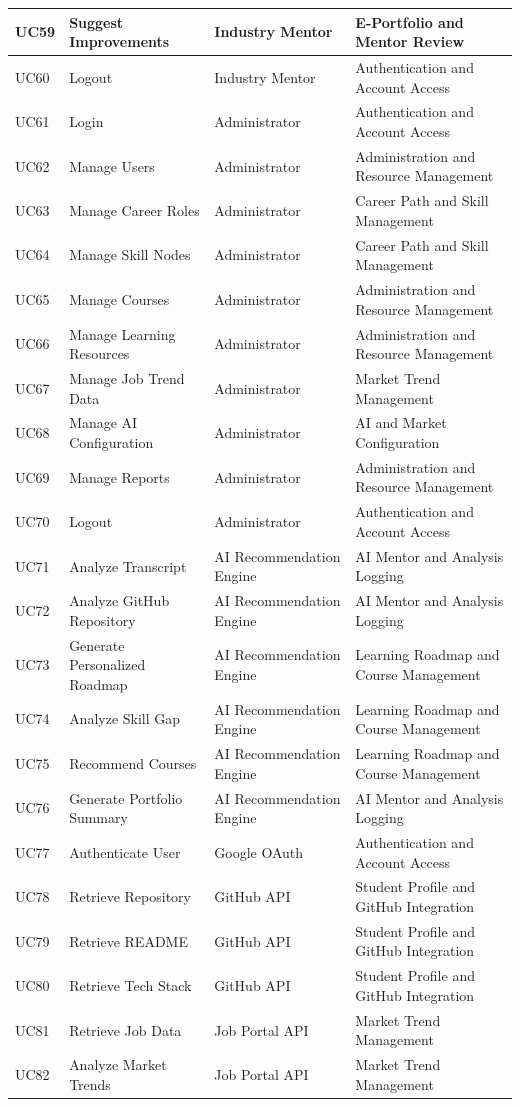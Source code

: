 \begin{longtable}{|>{\centering\arraybackslash}m{0.8cm}|>{\raggedright\arraybackslash}m{3.0cm}|>{\raggedright\arraybackslash}m{2.4cm}|>{\raggedright\arraybackslash}m{4.8cm}|}
\hline
UC59 & Suggest Improvements & Industry Mentor & E-Portfolio and Mentor Review \\
\hline
UC60 & Logout & Industry Mentor & Authentication and Account Access \\
\hline
UC61 & Login & Administrator & Authentication and Account Access \\
\hline
UC62 & Manage Users & Administrator & Administration and Resource Management \\
\hline
UC63 & Manage Career Roles & Administrator & Career Path and Skill Management \\
\hline
UC64 & Manage Skill Nodes & Administrator & Career Path and Skill Management \\
\hline
UC65 & Manage Courses & Administrator & Administration and Resource Management \\
\hline
UC66 & Manage Learning Resources & Administrator & Administration and Resource Management \\
\hline
UC67 & Manage Job Trend Data & Administrator & Market Trend Management \\
\hline
UC68 & Manage AI Configuration & Administrator & AI and Market Configuration \\
\hline
UC69 & Manage Reports & Administrator & Administration and Resource Management \\
\hline
UC70 & Logout & Administrator & Authentication and Account Access \\
\hline
UC71 & Analyze Transcript & AI Recommendation Engine & AI Mentor and Analysis Logging \\
\hline
UC72 & Analyze GitHub Repository & AI Recommendation Engine & AI Mentor and Analysis Logging \\
\hline
UC73 & Generate Personalized Roadmap & AI Recommendation Engine & Learning Roadmap and Course Management \\
\hline
UC74 & Analyze Skill Gap & AI Recommendation Engine & Learning Roadmap and Course Management \\
\hline
UC75 & Recommend Courses & AI Recommendation Engine & Learning Roadmap and Course Management \\
\hline
UC76 & Generate Portfolio Summary & AI Recommendation Engine & AI Mentor and Analysis Logging \\
\hline
UC77 & Authenticate User & Google OAuth & Authentication and Account Access \\
\hline
UC78 & Retrieve Repository & GitHub API & Student Profile and GitHub Integration \\
\hline
UC79 & Retrieve README & GitHub API & Student Profile and GitHub Integration \\
\hline
UC80 & Retrieve Tech Stack & GitHub API & Student Profile and GitHub Integration \\
\hline
UC81 & Retrieve Job Data & Job Portal API & Market Trend Management \\
\hline
UC82 & Analyze Market Trends & Job Portal API & Market Trend Management \\
\hline
\end{longtable}

